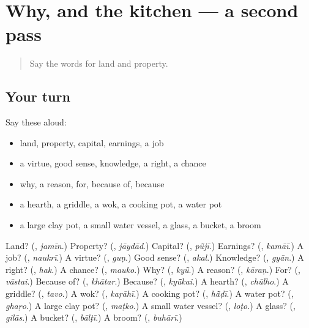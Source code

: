 \section[(dialogue)]{Why, and the kitchen — a second pass}

\label{lesson:MW-R119-second-pass-why-and-the-kitchen}



\begin{quote}
Say the words for land and property.
\end{quote}

\subsection*{Your turn}
Say these aloud:

\begin{itemize}
\raggedright
  \item land, property, capital, earnings, a job
  \item a virtue, good sense, knowledge, a right, a chance
  \item why, a reason, for, because of, because
  \item a hearth, a griddle, a wok, a cooking pot, a water pot
  \item a large clay pot, a small water vessel, a glass, a bucket, a broom
\end{itemize}

\begin{tcolorbox}[breakable,colback=teal!4,colframe=teal!35!black,title={Before you move on}]
Land? (\textbf{}, \emph{jamīn}.) Property? (\textbf{}, \emph{jāydād}.) Capital? (\textbf{}, \emph{pū̃jī}.) Earnings? (\textbf{}, \emph{kamāī}.) A job? (\textbf{}, \emph{naukrī}.) A virtue? (\textbf{}, \emph{guṇ}.) Good sense? (\textbf{}, \emph{akal}.) Knowledge? (\textbf{}, \emph{gyān}.) A right? (\textbf{}, \emph{hak}.) A chance? (\textbf{}, \emph{mauko}.) Why? (\textbf{}, \emph{kyū̃}.) A reason? (\textbf{}, \emph{kāraṇ}.) For? (\textbf{}, \emph{vāstai}.) Because of? (\textbf{}, \emph{khātar}.) Because? (\textbf{}, \emph{kyū̃kai}.) A hearth? (\textbf{}, \emph{chūlho}.) A griddle? (\textbf{}, \emph{tavo}.) A wok? (\textbf{}, \emph{kaṛāhī}.) A cooking pot? (\textbf{}, \emph{hā̃ḍī}.) A water pot? (\textbf{}, \emph{ghaṛo}.) A large clay pot? (\textbf{}, \emph{maṭko}.) A small water vessel? (\textbf{}, \emph{loṭo}.) A glass? (\textbf{}, \emph{gilās}.) A bucket? (\textbf{}, \emph{bālṭī}.) A broom? (\textbf{}, \emph{buhārī}.)
\end{tcolorbox}

